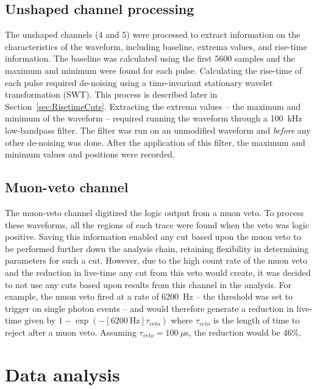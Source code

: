 		\subsection{Unshaped channel processing}
		\label{sec:UnshapedWFProc}

The unshaped channels (4 and 5) were processed to extract information on the characteristics of the waveform, including baseline, extrema values, and rise-time information.    The baseline was calculated using the first 5600 samples and the maximum and minimum were found for each pulse.  Calculating the rise-time of each pulse required de-noising using a time-invariant stationary wavelet transformation (SWT).  This process is described later in Section~\ref{sec:RisetimeCuts}.  Extracting the extrema values -- the maximum and minimum of the waveform -- required running the waveform through a 100~kHz low-bandpass filter.  The filter was run on an unmodified waveform and \emph{before} any other de-noising was done.  After the application of this filter, the maximum and minimum values and positions were recorded.  

		\subsection{Muon-veto channel}
		\label{sec:MuonProc}

The muon-veto channel digitized the logic output from a muon veto.  To process these waveforms, all the regions of each trace were found when the veto was logic positive.  Saving this information enabled any cut based upon the muon veto to be performed further down the analysis chain, retaining flexibility in determining parameters for such a cut.  However, due to the high count rate of the muon veto and the reduction in live-time any cut from this veto would create, it was decided to not use any cuts based upon results from this channel in the analysis.  For example, the muon veto fired at a rate of 6200~Hz -- the threshold was set to trigger on single photon events -- and would therefore generate a reduction in live-time given by $1-\exp(- [6200~\text{Hz}]\tau_{veto})$ where $\tau_{veto}$ is the length of time to reject after a muon veto.  Assuming $\tau_{veto}=100~\mu$s, the reduction would be 46\%.


	\section{Data analysis}
	\label{sec:BeGeDataAnalysis}
	
